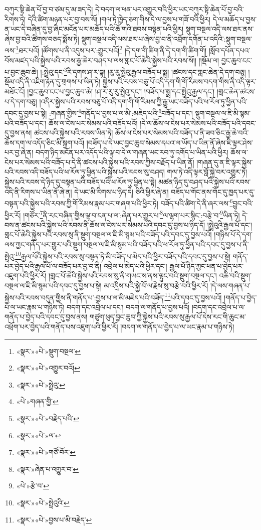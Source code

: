 བཀུར་སྟི་ཆེན་པོ་བྱ་བ་ཙམ་དུ་མ་ཟད་དེ། དེ་བདག་ལ་ཕན་པར་འགྱུར་བའི་ཕྱིར་ཡང་བཀུར་སྟི་ཆེན་པོ་བྱ་བའི་རིགས་ཏེ། དེའི་ཚིག་མཉན་པར་བྱ་བས་སོ། །གལ་ཏེ་ཁྱེད་ཅག་གིས་དེ་ལ་བྱས་པ་གཟོ་བའི་ཕྱིར། དེ་ལ་མཆོད་པ་བྱས་ན་ཡང་དེ་བཞིན་དུ་བྱ་ཞིང་མངོན་པར་མཆོད་པའི་ཆོ་གའི་ཐབས་བསྟན་པའི་ཕྱིར། སྡུག་བསྔལ་འདི་ལས་ཐར་ནས་ཞེས་བྱ་བའི་ཚིགས་བཅད་སྨོས་ཏེ། སྡུག་བསྔལ་འདི་ལས་ཐར་པ་ཞེས་བྱ་བ་ནི་འབྲོག་དགོན་པ་འདིའི་:སྡུག་བསྔལ་ལས་\footnote{«སྣར་»«པེ་»སྡུག་བསྔལ་}ཐར་པའོ། །ཚོགས་པ་ནི་འདུས་པར་:གྱུར་པའོ།\footnote{«སྣར་»«པེ་»འགྱུར་བའོ།} །དེ་དག་གི་ཚིག་ནི་དེ་དག་གི་ཚིག་གོ། །སློབ་དཔོན་དཔའ་བོས་མཛད་པའི་སྐྱེས་པའི་རབས་རྒྱ་ཆེར་བཤད་པ་ལས་གླང་པོ་ཆེའི་སྐྱེས་པའི་རབས་སོ།། །།སྡོམ་ལ། བྱང་ཆུབ་ངང་པ་བྱང་ཆུབ་ཆེ། །:སྤྲེའུ་དང་\footnote{«སྣར་»«པེ་»སྤྲེའུ་}རི་དྭགས་ཤ་ར་བྷ། །རུ་རུ་སྤྲེའུ་རྒྱལ་བཟོད་པ་སྨྲ། །ཚངས་དང་གླང་ཆེན་དེ་དག་བཅུ། །སྡོམ་འདི་ནི་འཇིག་རྟེན་དུ་གྲགས་པ་ཡིན་ཏེ། སྐྱེས་པའི་རབས་བཅུ་པོ་འདི་དག་གི་གོ་རིམས་བདག་གིས་ནི་འདི་ལྟར་མཐོང་ངོ། །བྱང་ཆུབ་ངང་པ་བྱང་ཆུབ་ཆེ། །ཤ་ར་རུ་རུ་སྤྲེའུ་དང་། །བཟོད་པ་སྨྲ་དང་སྤྲེའུ་རྒྱལ་དང་། །གླང་ཆེན་ཚངས་པ་དེ་དག་བཅུ། །འདིར་སྐྱེས་པའི་རབས་བཅུ་པོ་འདི་དག་གི་གོ་རིམས་ཀྱི་རྒྱུ་ཡང་བཟོད་པའི་ཕ་རོལ་ཏུ་ཕྱིན་པའི་དབང་དུ་བྱས་པ་སྟེ། :གཞན་གྱིས་\footnote{«པེ་»གཞན་གྱི་}གནོད་པ་བྱས་པ་ལ་མི་:མཇེད་པའི་\footnote{«སྣར་»«པེ་»བརྗེད་པའི་}བཟོད་པ་དང་། སྡུག་བསྔལ་ལ་ཇི་མི་སྙམ་པའི་བཟོད་པ་དང་། ཆོས་ལ་ངེས་པར་སེམས་པའི་བཟོད་པའོ། །དེ་ལ་ཆོས་ལ་ངེས་པར་སེམས་པའི་བཟོད་པའི་དབང་དུ་བྱས་ནས། ཚངས་པའི་སྐྱེས་པའི་རབས་ཡིན་ཏེ། ཆོས་ལ་ངེས་པར་སེམས་པའི་བཟོད་པ་ནི་ཟབ་ཅིང་རྒྱ་ཆེ་བའི་ཆོས་དག་ལ་འདོད་ཅིང་མི་སྐྲག་པའོ། །བཟོད་པ་དེ་ཡང་བྱང་ཆུབ་སེམས་དཔའ་ལ་ཡོད་པ་ཡིན་ནོ་ཞེས་ཇི་ལྟར་ཤེས་པར་བྱ་ཞེ་ན། བདག་ཉིད་མངོན་པར་འདོད་པའི་ལྟ་བ་དེ་ལ་གཞན་ཡང་རབ་ཏུ་འགོད་པ་ཡིན་པའི་ཕྱིར། ཆོས་ལ་ངེས་པར་སེམས་པའི་བཟོད་པ་དེ་ནི་ཚངས་པའི་སྐྱེས་པའི་རབས་ཀྱིས་བརྗོད་པ་ཡིན་ནོ། །གཞན་དུ་ན་ཇི་ལྟར་སྐྱེས་པའི་རབས་འདི་བཟོད་པའི་ཕ་རོལ་ཏུ་ཕྱིན་པའི་སྐྱེས་པའི་རབས་སུ་བཤད། གལ་ཏེ་འདི་ལྟར་བློ་སྐྱེ་བར་འགྱུར་ཏེ། སྐྱེས་པའི་རབས་དེ་ཉིད་དུ་བསྟན་པའི་བཟོད་པའི་ཕ་རོལ་ཏུ་ཕྱིན་པ་སྟེ། མཚན་ཉིད་དུ་བཤད་པའི་སྐྱེས་པའི་རབས་འདི་ནི་རིགས་པ་ཡིན་ནོ་ཞེ་ན། དེ་ཡང་མི་རིགས་པ་ཉིད་དེ། ཅིའི་ཕྱིར་ཞེ་ན། བཟོད་པ་གོང་ནས་གོང་དུ་ཁྱད་པར་དུ་བསྟན་པའི་སྐྱེས་པའི་རབས་ཀྱི་གོ་རིམས་རྣམ་པར་གཞག་པའི་ཕྱིར་ཏེ། བཟོད་པའི་ཚིག་དེ་ནི་ཞར་ལས་\footnote{«སྣར་»«པེ་»ལ་}བྱུང་བའི་ཕྱིར་རོ། །གཙོར་\footnote{«སྣར་»«པེ་»གཙོ་བོར་}ནི་རང་བཞིན་གྱིས་ལྟ་བ་ངན་པ་ལ་:ཞེན་པར་གྱུར་པ་\footnote{«སྣར་»ཞེན་པ་འགྱུར་བ་}ལ་ལྷག་པར་སྙིང་:བརྩེ་བ་\footnote{«པེ་»རྩེ་བ་}ཡིན་ཏེ། དེ་བས་ན་ཚངས་པའི་སྐྱེས་པའི་རབས་ནི་ཆོས་ལ་ངེས་པར་སེམས་པའི་དབང་དུ་བྱས་པ་ཉིད་དོ། །སྤྲེའུའི་རྒྱལ་པོ་དང་། གླང་པོ་ཆེའི་སྐྱེས་པའི་རབས་སུ་ནི་སྡུག་བསྔལ་ལ་ཇི་མི་སྙམ་པའི་བཟོད་པའི་དབང་དུ་བྱས་པའོ། །གཉིས་པོ་དེ་དག་ལས་ཀྱང་གནོད་པར་གྱུར་པའི་སྡུག་བསྔལ་ལ་ཇི་མི་སྙམ་པའི་བཟོད་པའི་ཕ་རོལ་ཏུ་ཕྱིན་པའི་དབང་དུ་བྱས་པ་ནི་སྤྲེའུ་\footnote{«སྣར་»«པེ་»སྤྲེའུའི་}རྒྱལ་པོའི་སྐྱེས་པའི་རབས་སུ་བསྟན་ཏེ་མི་བཟོད་པ་མེད་པའི་ཕྱིར་བཟོད་པའི་དབང་དུ་བྱས་པ་སྟེ། གནོད་པར་བྱེད་པའི་རྒྱལ་པོ་ལ་བཟོད་པར་བྱ་བ་ནི། འབྲེལ་པ་མེད་པའི་ཕྱིར་དང་། རྒྱལ་པོ་ཉིད་ཀྱང་ཕན་པ་བྱེད་པར་འཇུག་པའི་ཕྱིར་རོ། །གླང་པོ་ཆེའི་སྐྱེས་པའི་རབས་སུ་ནི་གཡང་ས་ནས་ལྟུང་བའི་སྡུག་བསྔལ་དང་། འཆི་བའི་སྡུག་བསྔལ་ལ་ཇི་མི་སྙམ་པའི་དབང་དུ་བྱས་པ་སྟེ། མ་འདྲིས་པའི་སྐྱེ་བོ་ལ་རྗེས་སུ་བརྩེ་བའི་ཕྱིར་རོ། །དེ་ལས་གཞན་པ་སྐྱེས་པའི་རབས་བདུན་གྱིས་ནི་གནོད་པ་:བྱས་པ་ལ་མི་མཇེད་པའི་བཟོད་\footnote{«སྣར་»«པེ་»བྱས་པ་མི་བརྗེད་}པའི་དབང་དུ་བྱས་པའོ། །གནོད་པ་བྱེད་པ་ལ་ཡང་རྣམ་པ་གཉིས་ཏེ། བདག་དང་འབྲེལ་པ་དང་། བདག་ལ་གནོད་པ་བྱས་པའོ། །བདག་དང་འབྲེལ་པ་ལ་གནོད་པ་བྱེད་པའི་དབང་དུ་བྱས་ནས། གཙུག་ཕུད་བྱང་ཆུབ་ཀྱི་སྐྱེས་པའི་རབས་སུ་རྒྱལ་པོ་དེས་རང་གི་ཆུང་མ་འཕྲོག་པར་བྱེད་པའི་གནོད་པས་འཇུག་པའི་ཕྱིར་རོ། །བདག་ལ་གནོད་པ་བྱེད་པ་ལ་ཡང་རྣམ་པ་གཉིས་ཏེ། 